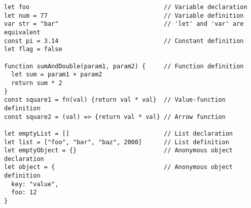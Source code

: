 \vspace{-2.5em}
\begin{center}
\begin{minipage}[t]{1\textwidth}
\begin{listing}[H]
\begin{spacing}{0.6}
\begin{verbatim}
let foo                                     // Variable declaration
let num = 77                                // Variable definition
var str = "bar"                             // 'let' and 'var' are equivalent
const pi = 3.14                             // Constant definition
let flag = false

function sumAndDouble(param1, param2) {     // Function definition
  let sum = param1 + param2
  return sum * 2
}
const square1 = fn(val) {return val * val}  // Value-function definition
const square2 = (val) => {return val * val} // Arrow function

let emptyList = []                          // List declaration
let list = ["foo", "bar", "baz", 2000]      // List definition
let emptyObject = {}                        // Anonymous object declaration
let object = {                              // Anonymous object definition
  key: "value",
  foo: 12
}
\end{verbatim}
\end{spacing}
\end{listing}
\end{minipage}
\end{center}
